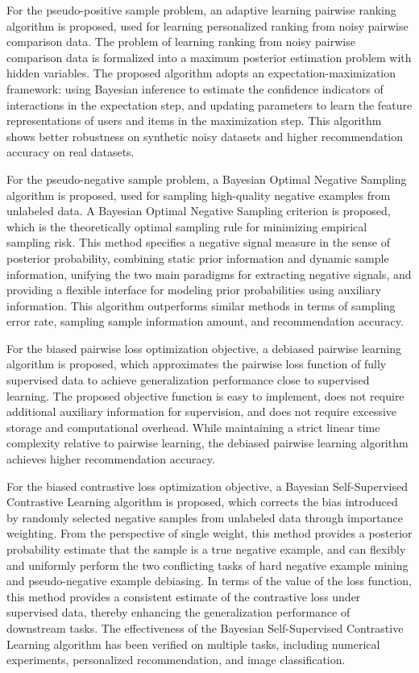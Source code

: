 {	For the pseudo-positive sample problem, an adaptive learning pairwise ranking algorithm is proposed, used for learning personalized ranking from noisy pairwise comparison data. The problem of learning ranking from noisy pairwise comparison data is formalized into a maximum posterior estimation problem with hidden variables. The proposed algorithm adopts an expectation-maximization framework: using Bayesian inference to estimate the confidence indicators of interactions in the expectation step, and updating parameters to learn the feature representations of users and items in the maximization step. This algorithm shows better robustness on synthetic noisy datasets and higher recommendation accuracy on real datasets.
	
	For the pseudo-negative sample problem, a Bayesian Optimal Negative Sampling algorithm is proposed, used for sampling high-quality negative examples from unlabeled data. A Bayesian Optimal Negative Sampling criterion is proposed, which is the theoretically optimal sampling rule for minimizing empirical sampling risk. This method specifies a negative signal measure in the sense of posterior probability, combining static prior information and dynamic sample information, unifying the two main paradigms for extracting negative signals, and providing a flexible interface for modeling prior probabilities using auxiliary information. This algorithm outperforms similar methods in terms of sampling error rate, sampling sample information amount, and recommendation accuracy.
	
	For the biased pairwise loss optimization objective, a debiased pairwise learning algorithm is proposed, which approximates the pairwise loss function of fully supervised data to achieve generalization performance close to supervised learning. The proposed objective function is easy to implement, does not require additional auxiliary information for supervision, and does not require excessive storage and computational overhead. While maintaining a strict linear time complexity relative to pairwise learning, the debiased pairwise learning algorithm achieves higher recommendation accuracy.
	
	For the biased contrastive loss optimization objective, a Bayesian Self-Supervised Contrastive Learning algorithm is proposed, which corrects the bias introduced by randomly selected negative samples from unlabeled data through importance weighting. From the perspective of single weight, this method provides a posterior probability estimate that the sample is a true negative example, and can flexibly and uniformly perform the two conflicting tasks of hard negative example mining and pseudo-negative example debiasing. In terms of the value of the loss function, this method provides a consistent estimate of the contrastive loss under supervised data, thereby enhancing the generalization performance of downstream tasks. The effectiveness of the Bayesian Self-Supervised Contrastive Learning algorithm has been verified on multiple tasks, including numerical experiments, personalized recommendation, and image classification.
	
}
